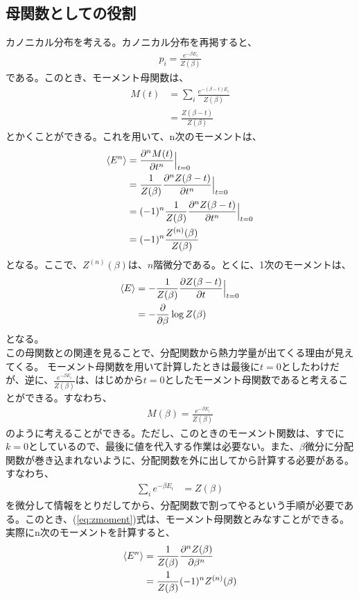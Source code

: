 \documentclass[a4paper,11pt]{jsarticle}
\numberwithin{equation}{section}
\begin{document}
\subsection{母関数としての役割}
カノニカル分布を考える。カノニカル分布を再掲すると、
\begin{align}
  p_i = \frac{e^{-\beta E_i}}{Z(\beta)}
\end{align}
である。このとき、モーメント母関数は、
\begin{align}
  M(t) &= \sum_{i}\frac{e^{-(\beta - t)E_i}}{Z(\beta)}\\
  &= \frac{Z(\beta - t)}{Z(\beta)}
\end{align}
とかくことができる。これを用いて、n次のモーメントは、
\begin{align}
  \expval{E^n} &= \pdv[n]{M(t)}{t}\Big|_{t=0}\\
  &= \frac{1}{Z(\beta)}\pdv[n]{Z(\beta - t)}{t}\Big|_{t=0}\\
  &= (-1)^n\frac{1}{Z(\beta)}\pdv[n]{Z(\beta-t)}{t}\Big|_{t=0}\\
  &= (-1)^n\frac{Z^{(n)}(\beta)}{Z(\beta)}
\end{align}
となる。ここで、$Z^{(n)}(\beta)$は、$n$階微分である。とくに、1次のモーメントは、
\begin{align}
  \expval{E} &= -\frac{1}{Z(\beta)}\pdv{Z(\beta - t)}{t}\Big|_{t=0}\\
  &= -\pdv{\beta}\log Z(\beta)
\end{align}
となる。\\
この母関数との関連を見ることで、分配関数から熱力学量が出てくる理由が見えてくる。
モーメント母関数を用いて計算したときは最後に$t=0$としたわけだが、逆に、$\frac{e^{-\beta E_i}}{Z(\beta)}$は、はじめから$t=0$としたモーメント母関数であると考えることができる。すなわち、
\begin{align}
  M(\beta) = \frac{e^{-\beta E_i}}{Z(\beta)}
\end{align}
のように考えることができる。ただし、このときのモーメント関数は、すでに$k=0$としているので、最後に値を代入する作業は必要ない。また、$\beta$微分に分配関数が巻き込まれないように、分配関数を外に出してから計算する必要がある。すなわち、
\begin{align}
  \sum_{i} e^{-\beta E_i} &= Z(\beta) \label{eq:zmoment}
\end{align}
を微分して情報をとりだしてから、分配関数で割ってやるという手順が必要である。このとき、(\ref{eq:zmoment})式は、モーメント母関数とみなすことができる。\\
実際にn次のモーメントを計算すると、
\begin{align}
  \expval{E^n} &= \frac{1}{Z(\beta)}\pdv[n]{Z(\beta)}{\beta}\\
  &= \frac{1}{Z(\beta)}(-1)^nZ^{(n)}(\beta)
\end{align}
\end{document}
